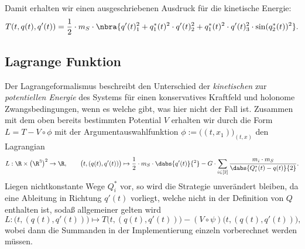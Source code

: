 \documentclass{subfiles}
\begin{document}
        \begin{ergebnis}
            Damit erhalten wir einen ausgeschriebenen Ausdruck für die kinetische Energie:
            \[
                T(t,q(t),q'(t)) = \frac{1}{2}\cdot m_S\cdot\nbra{q'(t)_1^2 + q_1^*(t)^2\cdot q'(t)_2^2 + q_1^*(t)^2\cdot q'(t)_3^2\cdot\sin(q_2^*(t))^2}.
            \]
        \end{ergebnis}

    \subsection*{Lagrange Funktion}
        Der Lagrangeformalismus beschreibt den Unterschied der \emph{kinetischen} zur \emph{potentiellen Energie} des Systems für einen konservatives Kraftfeld und holonome Zwangsbedingungen, wenn es welche gibt, was hier nicht der Fall ist.
        Zusammen mit dem oben bereits bestimmten Potential $V$ erhalten wir durch die Form $L = T - V\circ\phi$ mit der Argumentauswahlfunktion $\phi:=\bigl((t,x_1)\bigr)_{(t,x)}$ den Lagrangian
        \[
            L:\R\times\bigl(\R^3\bigr)^2\to\R,\qquad \bigl(t,(q(t),q'(t))\bigr)\mapsto \frac12\cdot m_S\cdot\dabs{q'(t)}{^2} - G\cdot\sum_{i\in[2]}\frac{m_i\cdot m_S}{\dabs{Q_i^*(t) - q(t)}{2}}.
        \]
        Liegen nichtkonstante Wege $Q_i^*$ vor, so wird die Strategie unverändert bleiben, da eine Ableitung in Richtung $q'(t)$ vorliegt, welche nicht in der Definition von $Q$ enthalten ist, sodaß allgemeiner gelten wird
        \[
            L:\bigl(t,(q(t),q'(t))\bigr)\mapsto T\bigl(t,(q(t),q'(t))\bigr) - (V\circ\psi)\bigl(t,(q(t),q'(t))\bigr),
        \]
        wobei dann die Summanden in der Implementierung einzeln vorberechnet werden müssen.
        
\end{document}
